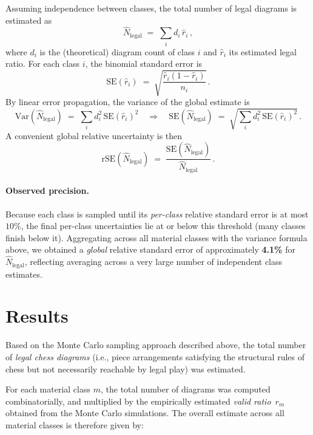 \documentclass[12pt]{article}
\begin{document}
Assuming independence between classes, the total number of legal diagrams is estimated as
\begin{equation}
\hat{N}_{\text{legal}} \;=\; \sum_{i} d_i\,\hat{r}_i \,,
\end{equation}
where $d_i$ is the (theoretical) diagram count of class $i$ and $\hat{r}_i$ its estimated legal ratio. For each class $i$, the binomial standard error is
\[
\mathrm{SE}(\hat{r}_i) \;=\; \sqrt{\frac{\hat{r}_i(1-\hat{r}_i)}{n_i}} \, .
\]
By linear error propagation, the variance of the global estimate is
\begin{equation}
\mathrm{Var}\!\left(\hat{N}_{\text{legal}}\right) \;=\; \sum_i d_i^2\,\mathrm{SE}(\hat{r}_i)^2
\quad\Rightarrow\quad
\mathrm{SE}\!\left(\hat{N}_{\text{legal}}\right) \;=\; 
\sqrt{ \sum_i d_i^2\,\mathrm{SE}(\hat{r}_i)^2 } \, .
\end{equation}
A convenient global relative uncertainty is then
\begin{equation}
\mathrm{rSE}\!\left(\hat{N}_{\text{legal}}\right)
\;=\;
\frac{\mathrm{SE}\!\left(\hat{N}_{\text{legal}}\right)}{\hat{N}_{\text{legal}}}\, .
\end{equation}

\paragraph{Observed precision.}
Because each class is sampled until its \emph{per-class} relative standard error is at most $10\%$, the final per-class uncertainties lie at or below this threshold (many classes finish below it). Aggregating across all material classes with the variance formula above, we obtained a \emph{global} relative standard error of approximately \textbf{4.1\%} for $\hat{N}_{\text{legal}}$, reflecting averaging across a very large number of independent class estimates.

\section{Results}

Based on the Monte Carlo sampling approach described above, the total number of \emph{legal chess diagrams} (i.e., piece arrangements satisfying the structural rules of chess but not necessarily reachable by legal play) was estimated.

For each material class $m$, the total number of diagrams was computed combinatorially, and multiplied by the empirically estimated \emph{valid ratio}~$r_m$ obtained from the Monte Carlo simulations.  
The overall estimate across all material classes is therefore given by:
\end{document}
